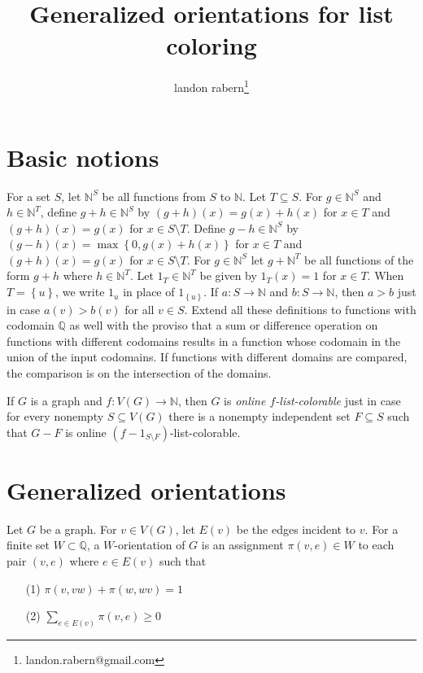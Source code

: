 \documentclass[12pt]{article}
\title{Generalized orientations for list coloring}
\author{landon rabern\thanks{landon.rabern@gmail.com}}
\newcommand{\IN}{\mathbb{N}}
\newcommand{\IQ}{\mathbb{Q}}
\newcommand{\set}[1]{\left\{ #1 \right\}}
\newcommand{\func}[3]{#1\colon #2 \rightarrow #3}
\begin{document}
\maketitle

\section{Basic notions}
For a set $S$, let $\IN^S$ be all functions from $S$ to $\IN$.  Let $T \subseteq S$. For $g\in \IN^S$ and $h \in \IN^T$, define $g+h \in \IN^S$ by $(g+h)(x) = g(x) + h(x)$ for $x \in T$ and $(g+h)(x) = g(x)$ for 
$x \in S\setminus T$. Define $g-h \in \IN^S$ by $(g-h)(x) = \max\set{0, g(x) + h(x)}$ for $x \in T$ and $(g+h)(x) = g(x)$ for $x \in S\setminus T$.  
For $g \in \IN^S$ let $g + \IN^T$ be all functions of the form $g + h$ where $h \in \IN^T$.  Let $1_T \in \IN^T$ be given by $1_T(x) = 1$ for $x \in T$.  When $T = \set{u}$, we write $1_u$ in place of $1_{\set{u}}$.
If $\func{a}{S}{\IN}$ and $\func{b}{S}{\IN}$, then $a > b$ just in case $a(v) > b(v)$ for all $v \in S$.  Extend all these definitions to functions with codomain $\IQ$ as well with the proviso that 
a sum or difference operation on functions with different codomains results in a function whose codomain in the union of the input codomains.  If functions with different domains are compared, the comparison is on the
intersection of the domains.

If $G$ is a graph and $\func{f}{V(G)}{\IN}$, then $G$ is \emph{online $f$-list-colorable} just in case for every nonempty $S \subseteq V(G)$ there is a nonempty independent set $F \subseteq S$
such that $G - F$ is online $(f-1_{S\setminus F})$-list-colorable.


\section{Generalized orientations}
Let $G$ be a graph.  For $v \in V(G)$, let $E(v)$ be the edges incident to $v$.    For a finite set $W \subset \IQ$, a $W$-orientation of $G$ is an assignment $\pi(v,e) \in W$ to each pair $(v,e)$ where $e \in E(v)$ such that
\begin{enumerate}
\item[(1)] $\pi(v, vw) + \pi(w, wv) = 1$ \\
\item[(2)] $\sum_{e \in E(v)} \pi(v, e) \ge 0$ 
\end{enumerate}
\end{document}
